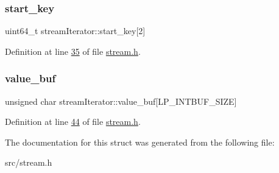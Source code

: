 \subsubsection{\texorpdfstring{start\+\_\+key}{start\_key}}
{\footnotesize\ttfamily uint64\+\_\+t stream\+Iterator\+::start\+\_\+key\mbox{[}2\mbox{]}}



Definition at line \hyperlink{stream_8h_source_l00035}{35} of file \hyperlink{stream_8h_source}{stream.\+h}.

\mbox{\label{structstreamIterator_af9077b7f2023f9dc82855dfd9e9d4f89}} 
\subsubsection{\texorpdfstring{value\+\_\+buf}{value\_buf}}
{\footnotesize\ttfamily unsigned char stream\+Iterator\+::value\+\_\+buf\mbox{[}L\+P\+\_\+\+I\+N\+T\+B\+U\+F\+\_\+\+S\+I\+ZE\mbox{]}}



Definition at line \hyperlink{stream_8h_source_l00044}{44} of file \hyperlink{stream_8h_source}{stream.\+h}.



The documentation for this struct was generated from the following file\+:\begin{DoxyCompactItemize}
\item 
src/stream.\+h\end{DoxyCompactItemize}
